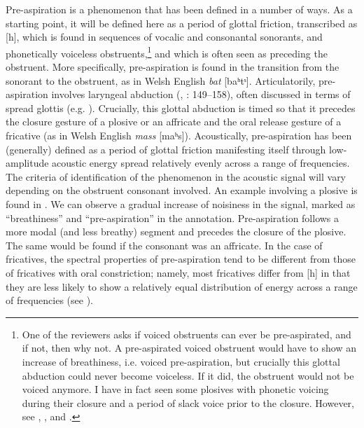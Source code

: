 \documentclass[output=paper]{langscibook}
\begin{document}
Pre-aspiration is a phenomenon that has been defined in a number of ways. As a starting point, it will be defined here as a period of glottal friction, transcribed as [h], which is found in sequences of vocalic and consonantal sonorants, and phonetically voiceless obstruents,\footnote{One of the reviewers asks if voiced obstruents can ever be pre-aspirated, and if not, then why not. A pre-aspirated voiced obstruent would have to show an increase of breathiness, i.e. voiced pre-aspiration, but crucially this glottal abduction could never become voiceless. If it did, the obstruent would not be voiced anymore. I have in fact seen some plosives with phonetic voicing during their closure and a period of slack voice prior to the closure. However, see \citet[230--234]{Steriade1994}, \citet[211]{Kehrein2002}, and .} and which is often seen as preceding the obstruent. More specifically, pre\hyp aspiration is found in the transition from the sonorant to the obstruent, as in Welsh English \textit{bat} [baʰtˢ]. Articulatorily, pre\hyp aspiration involves laryngeal abduction (\citealt{LöfqvistYoshioka1981}, \citealt{Chasaide1985}: 149--158), often discussed in terms of spread glottis (e.g. \citealt{Kingston1990}). Crucially, this glottal abduction is timed so that it precedes the closure gesture of a plosive or an affricate and the oral release gesture of a fricative (as in Welsh English \textit{mass} [maʰs]). Acoustically, pre\hyp aspiration has been (generally) defined as a period of glottal friction manifesting itself through low-amplitude acoustic energy spread relatively evenly across a range of frequencies. The criteria of identification of the phenomenon in the acoustic signal will vary depending on the obstruent consonant involved. An example involving a plosive is found in . We can observe a gradual increase of noisiness in the signal, marked as “breathiness” and “pre-aspiration” in the annotation. Pre-aspiration follows a more modal (and less breathy) segment and precedes the closure of the plosive. The same would be found if the consonant was an affricate. In the case of fricatives, the spectral properties of pre\hyp aspiration tend to be different from those of fricatives with oral constriction; namely, most fricatives differ from [h] in that they are less likely to show a relatively equal distribution of energy across a range of frequencies (see \citealt{Hejná2016a}).
\end{document}
